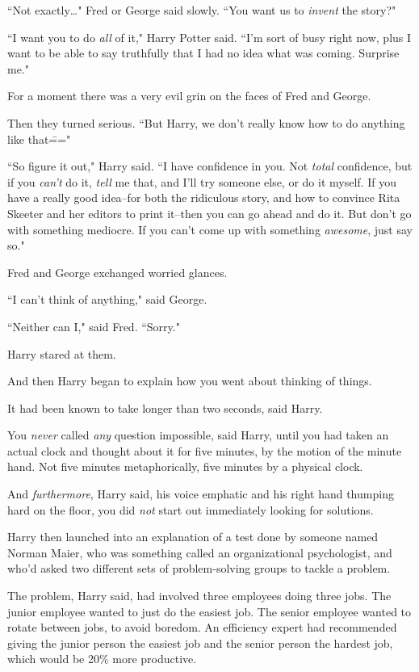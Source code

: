 ``Not exactly{\ldots}" Fred or George said slowly. ``You want us to \emph{invent} the story?"

``I want you to do \emph{all} of it," Harry Potter said. ``I'm sort of busy right now, plus I want to be able to say truthfully that I had no idea what was coming. Surprise me."

For a moment there was a very evil grin on the faces of Fred and George.

Then they turned serious. ``But Harry, we don't really know how to do anything like that\==="

``So figure it out," Harry said. ``I have confidence in you. Not \emph{total} confidence, but if you \emph{can't} do it, \emph{tell} me that, and I'll try someone else, or do it myself. If you have a really good idea\---for both the ridiculous story, and how to convince Rita Skeeter and her editors to print it\---then you can go ahead and do it. But don't go with something mediocre. If you can't come up with something \emph{awesome}, just say so."

Fred and George exchanged worried glances.

``I can't think of anything," said George.

``Neither can I," said Fred. ``Sorry."

Harry stared at them.

And then Harry began to explain how you went about thinking of things.

It had been known to take longer than two seconds, said Harry.

You \emph{never} called \emph{any} question impossible, said Harry, until you had taken an actual clock and thought about it for five minutes, by the motion of the minute hand. Not five minutes metaphorically, five minutes by a physical clock.

And \emph{furthermore}, Harry said, his voice emphatic and his right hand thumping hard on the floor, you did \emph{not} start out immediately looking for solutions.

Harry then launched into an explanation of a test done by someone named Norman Maier, who was something called an organizational psychologist, and who'd asked two different sets of problem-solving groups to tackle a problem.

The problem, Harry said, had involved three employees doing three jobs. The junior employee wanted to just do the easiest job. The senior employee wanted to rotate between jobs, to avoid boredom. An efficiency expert had recommended giving the junior person the easiest job and the senior person the hardest job, which would be 20\% more productive.

